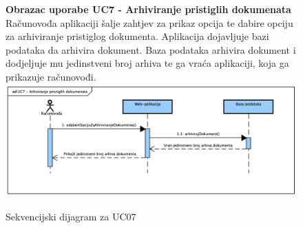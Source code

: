 				\begin{figure}[H]
					\textbf{Obrazac uporabe UC7 - Arhiviranje pristiglih dokumenata}
					\newline
					Računovođa aplikaciji šalje zahtjev za prikaz opcija te dabire opciju za arhiviranje pristiglog dokumenta. Aplikacija dojavljuje bazi podataka da arhivira dokument.
					Baza podataka arhivira dokument i dodjeljuje mu jedinstveni broj arhiva te ga vraća aplikaciji, koja ga prikazuje računovođi.
					\newline
					\includegraphics[width=\textwidth]{slike/Sequence_UC07.png}
					\caption{Sekvencijski dijagram za UC07}
					\label{fig:sequence_UC07}
				\end{figure}

